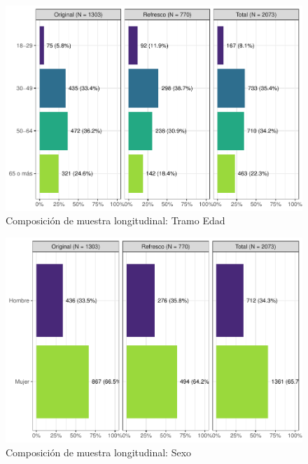 \documentclass[
  12pt,
]{book}
\begin{document}
\begin{figure}

{\centering \includegraphics{reporte-elsoc_files/figure-latex/graf-edadt-muestra-1} 

}

\caption{Composición de muestra longitudinal: Tramo Edad}\label{fig:graf-edadt-muestra}
\end{figure}

\begin{figure}

{\centering \includegraphics{reporte-elsoc_files/figure-latex/graf-sexo-muestra-1} 

}

\caption{Composición de muestra longitudinal: Sexo}\label{fig:graf-sexo-muestra}
\end{figure}
\end{document}
